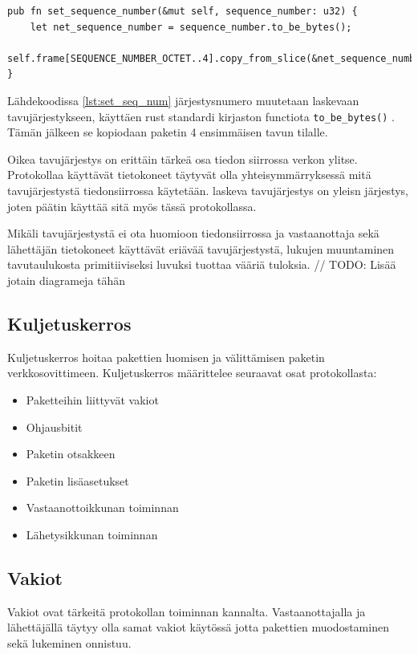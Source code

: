 \documentclass[a4paper,12pt]{article}
\begin{document}
\begin{lstlisting}[caption={Järjestusnumeron asettaminen pakettiin}, label={lst:set_seq_num}]
pub fn set_sequence_number(&mut self, sequence_number: u32) {
    let net_sequence_number = sequence_number.to_be_bytes();
    self.frame[SEQUENCE_NUMBER_OCTET..4].copy_from_slice(&net_sequence_number);
}
\end{lstlisting}

Lähdekoodissa \ref{lst:set_seq_num} järjestysnumero muutetaan laskevaan tavujärjestykseen, käyttäen rust standardi kirjaston functiota \lstinline{to_be_bytes()} \cite{rust_doc_u32}. Tämän jälkeen se kopiodaan paketin 4 ensimmäisen tavun tilalle. \par
Oikea tavujärjestys on erittäin tärkeä osa tiedon siirrossa verkon ylitse. Protokollaa käyttävät tietokoneet täytyvät olla yhteisymmärryksessä mitä tavujärjestystä tiedonsiirrossa käytetään. laskeva tavujärjestys on yleisn järjestys, joten päätin käyttää sitä myös tässä protokollassa. \par
Mikäli tavujärjestystä ei ota huomioon tiedonsiirrossa ja vastaanottaja sekä lähettäjän tietokoneet käyttävät eriävää tavujärjestystä, lukujen muuntaminen tavutaulukosta primitiiviseksi luvuksi tuottaa vääriä tuloksia.
\cite{Adiga2007HowC}
// TODO: Lisää jotain diagrameja tähän

    \subsection{Kuljetuskerros}\label{subsec:kuljetuskerros}
    Kuljetuskerros hoitaa pakettien luomisen ja välittämisen paketin verkkosovittimeen.
    Kuljetuskerros määrittelee seuraavat osat protokollasta:

    \begin{itemize}
        \item Paketteihin liittyvät vakiot
        \item Ohjausbitit
        \item Paketin otsakkeen
        \item Paketin lisäasetukset
        \item Vastaanottoikkunan toiminnan
        \item Lähetysikkunan toiminnan
    \end{itemize}

    \subsection{Vakiot}
    Vakiot ovat tärkeitä protokollan toiminnan kannalta. Vastaanottajalla ja lähettäjällä täytyy olla samat vakiot käytössä jotta pakettien muodostaminen sekä lukeminen onnistuu.
\end{document}
